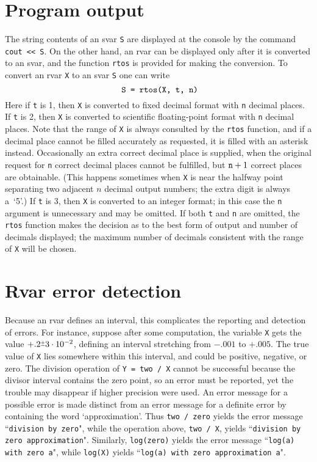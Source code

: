 \section{Program output}
The string contents of an svar {\tt S} are displayed at the console by
the command {\tt cout << S}. On the other hand, 
an rvar can be displayed only after it is converted to
an svar, and the function {\tt rtos} is provided for making the conversion.
To convert an rvar {\tt X} to an svar {\tt S} one can write
$$\hbox{ \tt S = rtos(X, t, n)}$$
Here if {\tt t} is 1, then {\tt X} is converted to fixed decimal format
with {\tt n} decimal places. If {\tt t} is 2, then {\tt X} is converted
to scientific floating-point format with {\tt n} decimal places.
Note that the range of {\tt X} is always consulted by the {\tt rtos} function,
and if a decimal place cannot be filled accurately as requested, it is
filled with an asterisk instead. Occasionally an extra correct
decimal place is supplied, when the original request
for {\tt n} correct decimal places cannot be fulfilled, but
$\hbox{\tt n}+1$ correct places
are obtainable. (This happens sometimes when {\tt X} is near
the halfway point separating two adjacent $n$ decimal output numbers;
the extra digit is always a~`5'.) If {\tt t} is 3, then {\tt X} is
converted to an integer format; in this case the {\tt n} argument is
unnecessary and may be omitted. If both {\tt t} and {\tt n} are omitted,
the {\tt rtos} function makes the decision as to the best form of output
and number of decimals displayed; the maximum number of decimals
consistent with the range of {\tt X} will be chosen.

\section{Rvar error detection}
Because an rvar defines an interval, this complicates the reporting and
detection of
errors. For instance, suppose
after some computation, the variable {\tt X} gets the value
$+.2\pms3\cdot 10^{-2}$,
defining an interval stretching from $-.001$ to $+.005$. The true value
of {\tt X} lies somewhere within this
interval, and could be positive, negative,
or zero. The division operation of {\tt Y = two / X} cannot be successful
because the divisor interval contains the zero point,
so an error must be reported, yet the trouble may disappear
if higher precision were used. An error message for a possible error is
made distinct from an error message for a definite error by containing
the word `approximation'.
Thus {\tt two / zero} yields the error message ``{\tt division by zero}",
while the operation above, {\tt two / X},  yields
``{\tt division by zero approximation}".
Similarly, {\tt log(zero)} yields the error message
``{\tt log(a) with zero a}",
while {\tt log(X)} yields ``{\tt log(a) with zero approximation a}".

